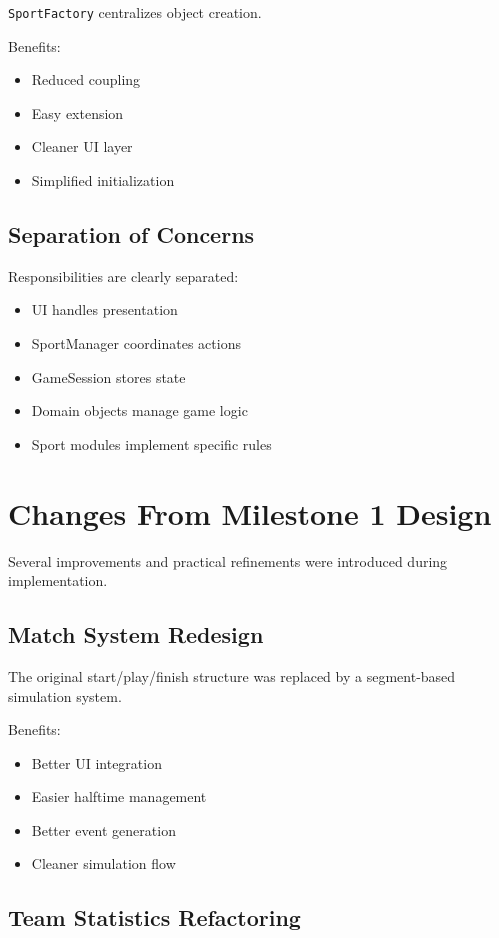 \documentclass[11pt,a4paper]{article}
\begin{document}
\texttt{SportFactory} centralizes object creation.

Benefits:
\begin{itemize}
\item Reduced coupling
\item Easy extension
\item Cleaner UI layer
\item Simplified initialization
\end{itemize}

\subsection{Separation of Concerns}

Responsibilities are clearly separated:
\begin{itemize}
\item UI handles presentation
\item SportManager coordinates actions
\item GameSession stores state
\item Domain objects manage game logic
\item Sport modules implement specific rules
\end{itemize}

\section{Changes From Milestone 1 Design}

Several improvements and practical refinements were introduced during implementation.

\subsection{Match System Redesign}

The original start/play/finish structure was replaced by a segment-based simulation system.

Benefits:
\begin{itemize}
\item Better UI integration
\item Easier halftime management
\item Better event generation
\item Cleaner simulation flow
\end{itemize}

\subsection{Team Statistics Refactoring}
\end{document}

